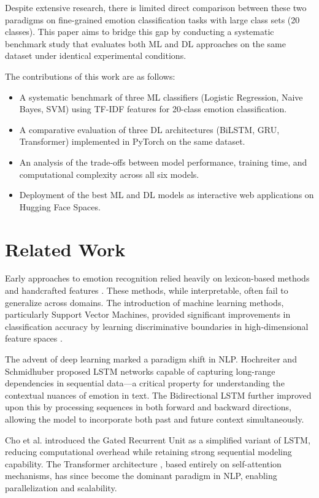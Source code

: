 \documentclass{article}
\begin{document}
Despite extensive research, there is limited direct comparison between these two paradigms on fine-grained emotion classification tasks with large class sets (20 classes). This paper aims to bridge this gap by conducting a systematic benchmark study that evaluates both ML and DL approaches on the same dataset under identical experimental conditions.

The contributions of this work are as follows:
\begin{itemize}
\item A systematic benchmark of three ML classifiers (Logistic Regression, Naive Bayes, SVM) using TF-IDF features for 20-class emotion classification.
\item A comparative evaluation of three DL architectures (BiLSTM, GRU, Transformer) implemented in PyTorch on the same dataset.
\item An analysis of the trade-offs between model performance, training time, and computational complexity across all six models.
\item Deployment of the best ML and DL models as interactive web applications on Hugging Face Spaces.
\end{itemize}

\section{Related Work}

Early approaches to emotion recognition relied heavily on lexicon-based methods and handcrafted features \cite{strapparava2008semeval}. These methods, while interpretable, often fail to generalize across domains. The introduction of machine learning methods, particularly Support Vector Machines, provided significant improvements in classification accuracy by learning discriminative boundaries in high-dimensional feature spaces \cite{pang2002thumbs}.

The advent of deep learning marked a paradigm shift in NLP. Hochreiter and Schmidhuber \cite{hochreiter1997long} proposed LSTM networks capable of capturing long-range dependencies in sequential data—a critical property for understanding the contextual nuances of emotion in text. The Bidirectional LSTM \cite{schuster1997bidirectional} further improved upon this by processing sequences in both forward and backward directions, allowing the model to incorporate both past and future context simultaneously.

Cho et al. \cite{cho2014gru} introduced the Gated Recurrent Unit as a simplified variant of LSTM, reducing computational overhead while retaining strong sequential modeling capability. The Transformer architecture \cite{vaswani2017attention}, based entirely on self-attention mechanisms, has since become the dominant paradigm in NLP, enabling parallelization and scalability.
\end{document}
